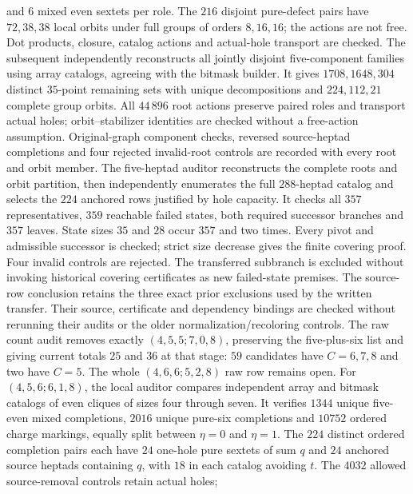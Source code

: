 and $6$ mixed even sextets per role. The $216$ disjoint pure-defect
pairs have $72,38,38$ local orbits under full groups of orders
$8,16,16$; the actions are not free. Dot products, closure,
catalog actions and actual-hole transport are checked. The subsequent
independently reconstructs all jointly disjoint five-component
families using array catalogs, agreeing with the bitmask builder.
It gives $1708,1648,304$ distinct $35$-point remaining sets with
unique decompositions and $224,112,21$ complete group orbits.
All $44\,896$ root actions preserve paired roles and transport
actual holes; orbit--stabilizer identities are checked without
a free-action assumption. Original-graph component checks,
reversed source-heptad completions and four rejected invalid-root
controls are recorded with every root and orbit member.
The five-heptad auditor
reconstructs the complete roots and orbit partition, then independently
enumerates the full $288$-heptad catalog and selects the $224$
anchored rows justified by hole capacity. It checks all $357$
representatives, $359$ reachable failed states, both required
successor branches and $357$ leaves. State sizes $35$ and $28$
occur $357$ and two times. Every pivot and admissible successor
is checked; strict size decrease gives the finite covering proof.
Four invalid controls are rejected. The transferred subbranch
is excluded without invoking historical covering certificates as
new failed-state premises. The source-row conclusion retains
the three exact prior exclusions used by the written transfer.
Their source, certificate and dependency bindings are checked
without rerunning their audits or the older normalization/recoloring
controls. The raw count audit removes exactly $(4,5,5;7,0,8)$,
preserving the five-plus-six list and giving current totals $25$
and $36$ at that stage: $59$ candidates have $C=6,7,8$ and two have $C=5$.
The whole $(4,6,6;5,2,8)$ raw row remains open.
For $(4,5,6;6,1,8)$, the local auditor
compares independent array and bitmask catalogs of even cliques
of sizes four through seven. It verifies $1344$ unique five-even
mixed completions, $2016$ unique pure-six completions and $10752$
ordered charge markings, equally split between $\eta=0$ and
$\eta=1$. The $224$ distinct ordered completion pairs each have
$24$ one-hole pure sextets of sum $q$ and $24$ anchored source
heptads containing $q$, with $18$ in each catalog avoiding $t$.
The $4032$ allowed source-removal controls retain actual holes;
